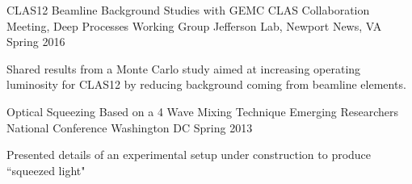 

\begin{cventries}

  \cventry
    {CLAS12 Beamline Background Studies with GEMC} %
    {CLAS Collaboration Meeting, Deep Processes Working Group} %
    {Jefferson Lab, Newport News, VA} %
    {Spring 2016} %
    {
      \begin{cvitems} %
        \item {Shared results from a Monte Carlo study aimed at increasing operating luminosity for CLAS12 by reducing background coming from beamline elements.}
      \end{cvitems}
    }

  \cventry
    {Optical Squeezing Based on a 4 Wave Mixing Technique } %
    {Emerging Researchers National Conference} %
    {Washington DC} %
    {Spring 2013} %
    {
      \begin{cvitems} %
        \item {Presented details of an experimental setup under construction to produce ``squeezed light"}
      \end{cvitems}
    }

\end{cventries}
